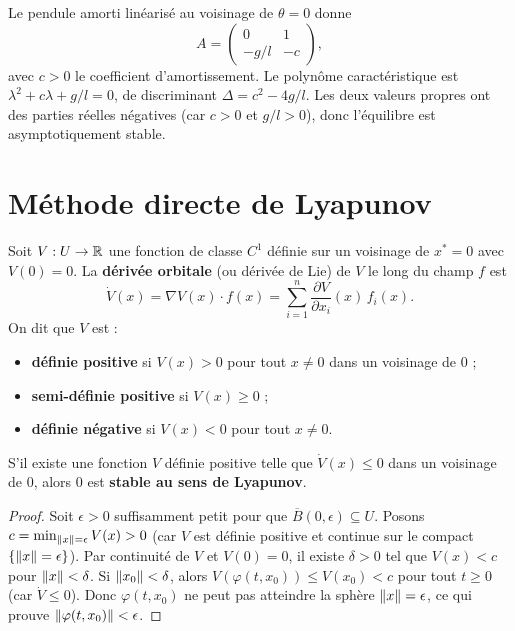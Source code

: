 \begin{exemple}
Le pendule amorti lin\'earis\'e au voisinage de $\theta = 0$ donne
\[
    A = \begin{pmatrix} 0 & 1 \\ -g/l & -c \end{pmatrix},
\]
avec $c > 0$ le coefficient d'amortissement. Le polyn\^ome caract\'eristique est
$\lambda^2 + c\lambda + g/l = 0$, de discriminant $\Delta = c^2 - 4g/l$.
Les deux valeurs propres ont des parties r\'eelles n\'egatives
(car $c > 0$ et $g/l > 0$), donc l'\'equilibre est asymptotiquement stable.
\end{exemple}

\section{M\'ethode directe de Lyapunov}

\begin{definition}
Soit $V : U \to \mathbb{R}$ une fonction de classe $C^1$ d\'efinie sur un voisinage
de $x^* = 0$ avec $V(0) = 0$. La \textbf{d\'eriv\'ee orbitale} (ou d\'eriv\'ee
de Lie) de $V$ le long du champ $f$ est
\[
    \dot{V}(x) = \nabla V(x) \cdot f(x) = \sum_{i=1}^n \frac{\partial V}{\partial x_i}(x)\, f_i(x).
\]
On dit que $V$ est :
\begin{itemize}
    \item \textbf{d\'efinie positive} si $V(x) > 0$ pour tout $x \neq 0$
    dans un voisinage de $0$ ;
    \item \textbf{semi-d\'efinie positive} si $V(x) \geq 0$ ;
    \item \textbf{d\'efinie n\'egative} si $V(x) < 0$ pour tout $x \neq 0$.
\end{itemize}
\end{definition}

\begin{theoreme}
\label{thm:lyap-stable}
S'il existe une fonction $V$ d\'efinie positive telle que $\dot{V}(x) \leq 0$
dans un voisinage de $0$, alors $0$ est \textbf{stable au sens de Lyapunov}.
\end{theoreme}

\begin{proof}
Soit $\epsilon > 0$ suffisamment petit pour que $\overline{B}(0, \epsilon) \subseteq U$.
Posons $c = \min_{\left\| x \right\| = \epsilon} V(x) > 0$ (car $V$ est d\'efinie positive
et continue sur le compact $\{\left\| x \right\| = \epsilon\}$). Par continuit\'e de $V$
et $V(0) = 0$, il existe $\delta > 0$ tel que $V(x) < c$ pour $\left\| x \right\| < \delta$.
Si $\left\| x_0 \right\| < \delta$, alors $V(\varphi(t, x_0)) \leq V(x_0) < c$ pour tout
$t \geq 0$ (car $\dot{V} \leq 0$). Donc $\varphi(t, x_0)$ ne peut pas atteindre
la sph\`ere $\left\| x \right\| = \epsilon$, ce qui prouve $\left\| \varphi(t, x_0) \right\| < \epsilon$.
\end{proof}


